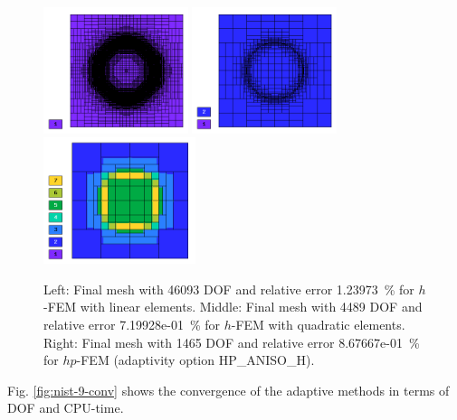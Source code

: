 \documentclass[12pt]{elsarticle}
\begin{document}
\begin{figure}[H]
\centering
\includegraphics[height=3.7cm]{nist/nist-9/mesh_h1_aniso.png}
\includegraphics[height=3.7cm]{nist/nist-9/mesh_h2_aniso.png}
\includegraphics[height=3.7cm]{nist/nist-9/mesh_hp_aniso.png}
\caption{
Left: Final mesh with 46093 DOF and relative error 1.23973~\% for $h$-FEM with linear elements.
Middle: Final mesh with 4489 DOF and relative error 7.19928e-01~\% for $h$-FEM with quadratic elements. 
Right: Final mesh with 1465 DOF and relative error 8.67667e-01~\% for $hp$-FEM (adaptivity option HP\_ANISO\_H).}
\label{fig:nist-9-hp-aniso}
\end{figure}

Fig. \ref{fig:nist-9-conv} shows the convergence of the adaptive methods in terms of DOF and CPU-time.
\end{document}
